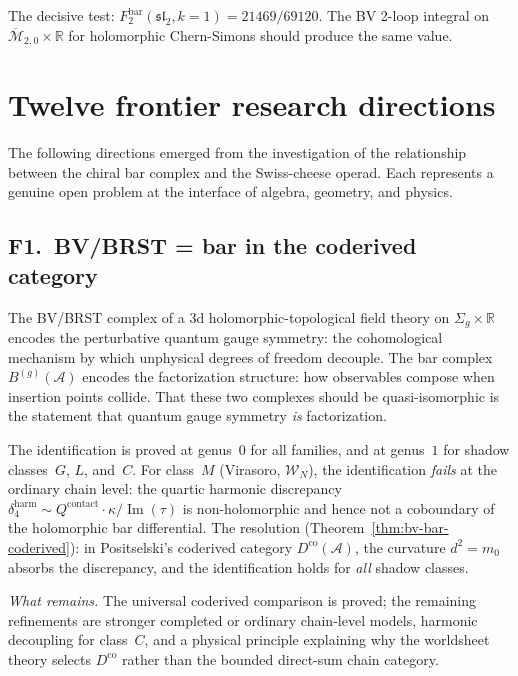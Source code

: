 \documentclass[11pt]{article}
\newcommand{\cA}{\mathcal{A}}
\newcommand{\cM}{\mathcal{M}}
\newcommand{\cW}{\mathcal{W}}
\newcommand{\bR}{\mathbb{R}}
\begin{document}
The decisive test: $F_2^{\mathrm{bar}}(\mathfrak{sl}_2, k{=}1) = 21469/69120$.
The BV 2-loop integral on $\overline{\cM}_{2,0} \times \bR$ for
holomorphic Chern-Simons should produce the same value.


\section{Twelve frontier research directions}

The following directions emerged from the investigation of the
relationship between the chiral bar complex and the Swiss-cheese
operad.  Each represents a genuine open problem at the interface of
algebra, geometry, and physics.

\subsection{F1.\ BV/BRST = bar in the coderived category}

The BV/BRST complex of a 3d holomorphic-topological field theory on
$\Sigma_g \times \bR$ encodes the perturbative quantum gauge
symmetry: the cohomological mechanism by which unphysical degrees of
freedom decouple.  The bar complex $B^{(g)}(\cA)$ encodes the
factorization structure: how observables compose when insertion points
collide.  That these two complexes should be quasi-isomorphic is the
statement that quantum gauge symmetry \emph{is} factorization.

The identification is proved at genus~$0$ for all families, and at
genus~$1$ for shadow classes~$G$, $L$, and~$C$.  For class~$M$
(Virasoro, $\cW_N$), the identification \emph{fails} at the ordinary
chain level: the quartic harmonic discrepancy
$\delta_4^{\mathrm{harm}} \sim Q^{\mathrm{contact}} \cdot \kappa /
\operatorname{Im}(\tau)$ is non-holomorphic and hence not a
coboundary of the holomorphic bar differential.  The resolution
(Theorem~\ref{thm:bv-bar-coderived}): in Positselski's coderived
category $D^{\mathrm{co}}(\cA)$, the curvature $d^2 = m_0$ absorbs
the discrepancy, and the identification holds for \emph{all} shadow
classes.

\emph{What remains.}  The universal coderived comparison is proved;
the remaining refinements are stronger completed or ordinary
chain-level models, harmonic decoupling for class~$C$, and a
physical principle explaining why the worldsheet theory selects
$D^{\mathrm{co}}$ rather than the bounded direct-sum chain category.
\end{document}

